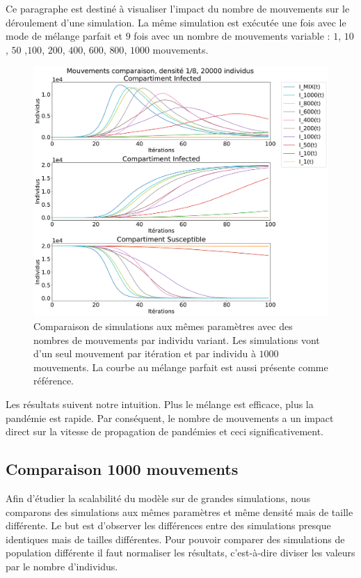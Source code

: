 Ce paragraphe est destiné à visualiser l'impact du nombre de mouvements sur le déroulement d'une simulation. La même simulation est exécutée une fois avec le mode de mélange parfait et $9$ fois avec un nombre de mouvements variable : $1$, $10$, $50$ ,$100$, $200$, $400$, $600$, $800$, $1000$ mouvements.

\begin{figure}[h]
	\centering
	\captionsetup{justification=centering}
	\includegraphics[width=.8\textwidth]{Images/SIR_mouvements_variables.pdf}
	\caption[Mouvements variable : SIR]{Comparaison de simulations aux mêmes paramètres avec des nombres de mouvements par individu variant. Les simulations vont d'un seul mouvement par itération et par individu à $1000$ mouvements. La courbe au mélange parfait est aussi présente comme référence.}
\end{figure}

Les résultats suivent notre intuition. Plus le mélange est efficace, plus la pandémie est rapide. Par conséquent, le nombre de mouvements a un impact direct sur la vitesse de propagation de pandémies et ceci significativement. 

\newpage

\subsection{Comparaison 1000 mouvements}

Afin d'étudier la scalabilité du modèle sur de grandes simulations, nous comparons des simulations aux mêmes paramètres et même densité mais de taille différente. Le but est d'observer les différences entre des simulations presque identiques mais de tailles différentes. Pour pouvoir comparer des simulations de population différente il faut normaliser les résultats, c'est-à-dire diviser les valeurs par le nombre d'individus.\\

